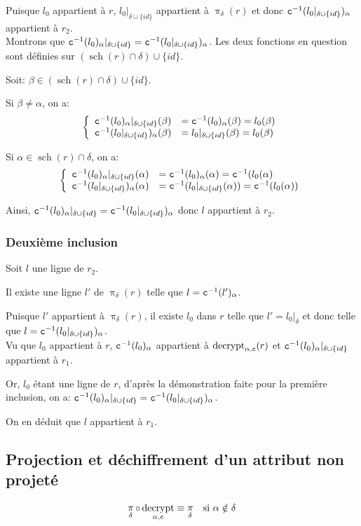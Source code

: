 \documentclass[french]{article}
\DeclareMathOperator{\proj}{\pi}
\DeclareMathOperator{\decrypt}{decrypt}
\DeclareMathOperator{\s}{sch}
\newcommand\typeT[1]{\text{\ttfamily #1}}
\newcommand{\decryptArgs}[2]{\decrypt_{#1 , \typeT{#2}}}
\newcommand{\projDelta}{\proj_{\delta}}
\newcommand{\decryptCAlpha}{\decryptArgs{\alpha}{c}}
\newcommand{\dc}[1]{\typeT{c}^{-1}(#1)}
\newcommand{\cip}{\cup \{id\}}
\begin{document}
Puisque $l_0$ appartient à $r$, $l_0|_{\delta \cip}$
appartient à $\projDelta(r)$ et donc
$\dc{l_0|_{\delta \cip}}_\alpha$ appartient à $r_2$. \\

Montrons que $\dc{l_0}_\alpha|_{\delta \cip} = \dc{l_0|_{\delta \cip}}_\alpha$.
Les deux fonctions en question sont définies sur $(\s(r)\cap \delta) \cip$.

Soit: $\beta \in (\s(r) \cap \delta) \cip$.

Si $\beta \neq \alpha$, on a:
$$
\left\lbrace
\begin{array}{ll}
\dc{l_0}_\alpha|_{\delta \cip}(\beta) 
& = \dc{l_0}_\alpha(\beta) = l_0(\beta) \\
\dc{l_0|_{\delta \cip}}_\alpha (\beta)
& = l_0|_{\delta \cip}(\beta) = l_0(\beta)
\end{array}
\right.
$$

Si $\alpha \in \s(r) \cap \delta$, on a:
$$
\left\lbrace
\begin{array}{ll}
\dc{l_0}_\alpha|_{\delta \cip}(\alpha) 
& = \dc{l_0}_\alpha(\alpha) = \dc{l_0(\alpha} \\
\dc{l_0|_{\delta \cip}}_\alpha (\alpha)
& = \dc{l_0|_{\delta \cip}(\alpha)} = \dc{l_0(\alpha)}
\end{array}
\right.
$$

Ainsi, $\dc{l_0}_\alpha|_{\delta \cip} = \dc{l_0|_{\delta \cip}}_\alpha$
donc $l$ appartient à $r_2$.

\subsubsection*{Deuxième inclusion}
Soit $l$ une ligne de $r_2$.

Il existe une ligne $l'$ de $\projDelta(r)$
telle que $l = \dc{l'}_\alpha$.

Puisque $l'$ appartient à $\projDelta(r)$, 
il existe $l_0$ dans $r$ telle que
$l' = l_0|_\delta$ et donc telle que
$l = \dc{l_0|_{\delta \cip}}_\alpha$. \\

Vu que $l_0$ appartient à $r$, 
$\dc{l_0}_\alpha$ appartient à $\decryptCAlpha(r)$
et $\dc{l_0}_\alpha|_{\delta \cip}$ appartient à $r_1$.

Or, $l_0$ étant une ligne de $r$,
d'après la démonstration faite pour la première inclusion, on a:
$\dc{l_0}_\alpha|_{\delta \cip} = \dc{l_0|_{\delta \cip}}_\alpha$.

On en déduit que $l$ appartient à $r_1$.


\subsection*{Projection et déchiffrement d'un attribut non projeté}
\begin{align}
\projDelta \circ \decryptArgs{\alpha}{c}
& \equiv \projDelta
&\text{si $\alpha \notin \delta$} 
\end{align}
\end{document}

